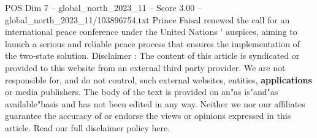 \begin{textsample}{POS Dim 7 – global\_north\_2023\_11 – Score 3.00 – global\_north\_2023\_11/103896754.txt}
Prince Faisal renewed the call for an international peace conference under the United Nations ' auspices, aiming to launch a serious and reliable peace process that ensures the implementation of the two-state solution.
Disclaimer : The content of this article is syndicated or provided to this website from an external third party provider.
We are not responsible for, and do not control, such external websites, entities, \textbf{applications} or media publishers.
The body of the text is provided on an"as is"and"as available"basis and has not been edited in any way.
Neither we nor our affiliates guarantee the accuracy of or endorse the views or opinions expressed in this article.
Read our full disclaimer policy here.

\end{textsample}
